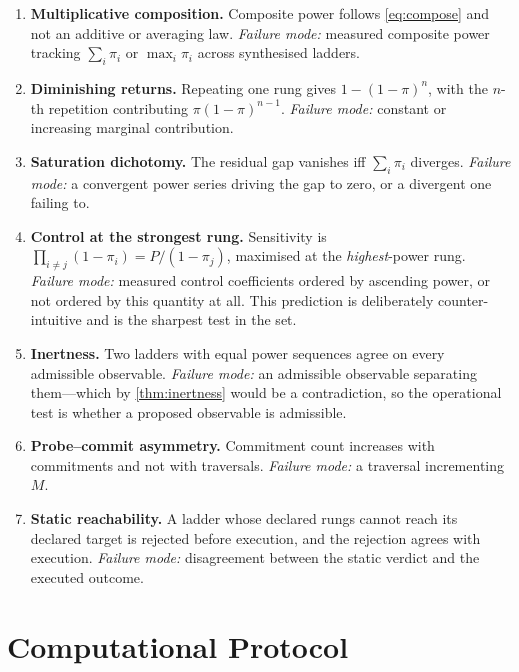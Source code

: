 \documentclass[11pt,twocolumn,a4paper]{article}
\theoremstyle{plain}
\theoremstyle{definition}
\theoremstyle{remark}
\newcommand{\pow}{\pi}
\begin{document}
\begin{enumerate}[label=\textbf{P\arabic*.},leftmargin=3em,itemsep=0.6em]

\item \textbf{Multiplicative composition.} Composite power follows
\cref{eq:compose} and not an additive or averaging law. \emph{Failure mode:}
measured composite power tracking $\sum_i\pow_i$ or $\max_i\pow_i$ across
synthesised ladders.

\item \textbf{Diminishing returns.} Repeating one rung gives $1-(1-\pow)^n$,
with the $n$-th repetition contributing $\pow(1-\pow)^{n-1}$. \emph{Failure
mode:} constant or increasing marginal contribution.

\item \textbf{Saturation dichotomy.} The residual gap vanishes iff
$\sum_i\pow_i$ diverges. \emph{Failure mode:} a convergent power series driving
the gap to zero, or a divergent one failing to.

\item \textbf{Control at the strongest rung.} Sensitivity is
$\prod_{i\neq j}(1-\pow_i) = P/(1-\pow_j)$, maximised at the
\emph{highest}-power rung. \emph{Failure mode:} measured control coefficients
ordered by ascending power, or not ordered by this quantity at all. This
prediction is deliberately counter-intuitive and is the sharpest test in the
set.

\item \textbf{Inertness.} Two ladders with equal power sequences agree on every
admissible observable. \emph{Failure mode:} an admissible observable separating
them---which by \cref{thm:inertness} would be a contradiction, so the
operational test is whether a proposed observable is admissible.

\item \textbf{Probe--commit asymmetry.} Commitment count increases with
commitments and not with traversals. \emph{Failure mode:} a traversal
incrementing $M$.

\item \textbf{Static reachability.} A ladder whose declared rungs cannot reach
its declared target is rejected before execution, and the rejection agrees with
execution. \emph{Failure mode:} disagreement between the static verdict and the
executed outcome.
\end{enumerate}

\section{Computational Protocol}
\label{sec:protocol}
\end{document}
